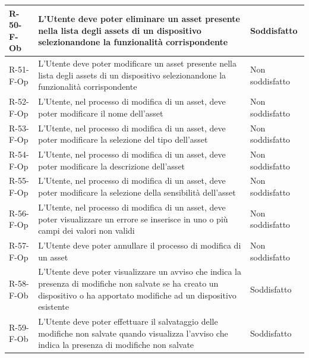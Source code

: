 \documentclass[a4paper,12pt]{article}
\begin{document}
{{\begin{longtable}{|l|p{}|p{}|}
                R-50-F-Ob       & L'Utente deve poter eliminare un asset presente nella lista degli assets di un dispositivo selezionandone la funzionalità corrispondente                                                    & Soddisfatto \\ \hline
                R-51-F-Op       & L'Utente deve poter modificare un asset presente nella lista degli assets di un dispositivo selezionandone la funzionalità corrispondente                                                   & Non soddisfatto \\ \hline
                R-52-F-Op       & L'Utente, nel processo di modifica di un asset, deve poter modificare il nome dell'asset                                                                                               & Non soddisfatto \\ \hline
                R-53-F-Op       & L'Utente, nel processo di modifica di un asset, deve poter modificare la selezione del tipo dell'asset                                                                                 & Non soddisfatto \\ \hline
                R-54-F-Op       & L'Utente, nel processo di modifica di un asset, deve poter modificare la descrizione dell'asset                                                                                        & Non soddisfatto \\ \hline
                R-55-F-Op       & L'Utente, nel processo di modifica di un asset, deve poter modificare la selezione della sensibilità dell'asset                                                                        & Non soddisfatto \\ \hline
                R-56-F-Op       & L'Utente, nel processo di modifica di un asset, deve poter visualizzare un errore se inserisce in uno o più campi dei valori non validi                                                     & Non soddisfatto \\ \hline
                R-57-F-Op       & L'Utente deve poter annullare il processo di modifica di un asset                                                                                                                           & Non soddisfatto \\ \hline
                R-58-F-Ob       & L'Utente deve poter visualizzare un avviso che indica la presenza di modifiche non salvate se ha creato un dispositivo o ha apportato modifiche ad un dispositivo esistente                 & Soddisfatto \\ \hline
                R-59-F-Ob       & L'Utente deve poter effettuare il salvataggio delle modifiche non salvate quando visualizza l'avviso che indica la presenza di modifiche non salvate                                        & Soddisfatto \\ \hline

\end{longtable}}}
\end{document}
